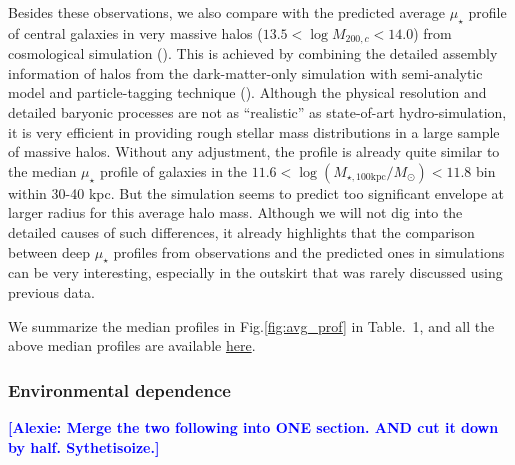 \documentclass{emulateapj}
\def\logmtot{{$\log (M_{\star,100\mathrm{kpc}}/M_{\odot})$}}
\def\mden{{$\mu_{\star}$}}
\newcommand{\alexie}[1]{\textcolor{blue}{\textbf{[Alexie: #1]}}}
\begin{document}
\begin{CJK*}{UTF8}{gbsn}
    Besides these observations, we also compare with the predicted average \mden{} 
    profile of central galaxies in very massive halos 
    ($13.5 < \log M_{200,c} < 14.0$) from cosmological simulation (\citealt{Cooper13}). 
    This is achieved by combining the detailed assembly information of halos from the 
    dark-matter-only simulation with semi-analytic model and particle-tagging technique 
    (\citealt{Cooper10}).
    Although the physical resolution and detailed baryonic processes are not as 
    ``realistic'' as state-of-art hydro-simulation, it is very efficient in providing 
    rough stellar mass distributions in a large sample of massive halos. 
    Without any adjustment, the profile is already quite similar to the median \mden{}
    profile of galaxies in the $11.6 <$\logmtot{}$< 11.8$ bin within 30-40 kpc. 
    But the simulation seems to predict too significant envelope at larger radius for 
    this average halo mass. 
    Although we will not dig into the detailed causes of such differences, it already 
    highlights that the comparison between deep \mden{} profiles from observations 
    and the predicted ones in simulations can be very interesting, especially in the 
    outskirt that was rarely discussed using previous data. 
    
    We summarize the median profiles in Fig.\ref{fig:avg_prof} in Table.~1,
    and all the above median profiles are available  
    \href{https://github.com/dr-guangtou/hsc_cenHighMh/tree/master/profiles}{here}.


\subsubsection{Environmental dependence}
    \label{sssec:sbp_mtot}    

\alexie{Merge the two following into ONE section. AND cut it down by half. Sythetisoize.}


\end{CJK*}
\end{document}
